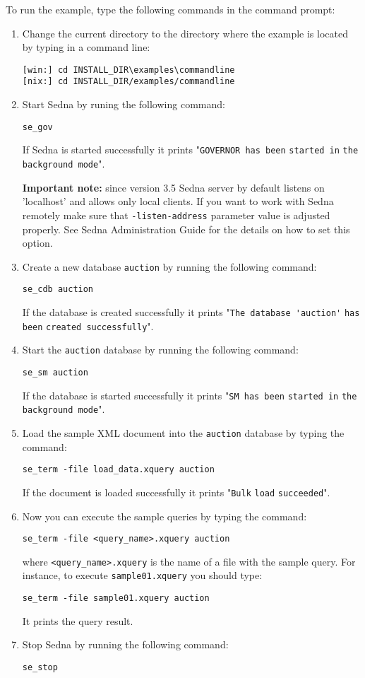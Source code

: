 \documentclass[a4paper,12pt]{article}
\begin{document}
To run the example, type the following commands in the command prompt:
\begin{enumerate}
\item Change the current directory to the directory where the example is located
by typing in a command line:
\begin{verbatim}
[win:] cd INSTALL_DIR\examples\commandline
[nix:] cd INSTALL_DIR/examples/commandline
\end{verbatim}

\item Start Sedna by runing the following command:
\begin{verbatim}
se_gov
\end{verbatim}
If Sedna is started successfully it prints "\verb!GOVERNOR has been!
\verb!started in! \verb!the background mode!".

\textbf{Important note:} since version 3.5 Sedna server by default listens
on 'localhost' and allows only local clients. If you want to work with Sedna
remotely make sure that \verb!-listen-address! parameter value is
adjusted properly. See Sedna Administration Guide for the details on how to set
this option.

\item Create a new database \verb!auction! by running the following command:
\begin{verbatim}
se_cdb auction
\end{verbatim}
If the database is created successfully it prints "\verb!The database 'auction'!
\verb!has been! \verb!created successfully!".

\item Start the \verb!auction! database by running the following command:
\begin{verbatim}
se_sm auction
\end{verbatim}
If the database is started successfully it prints "\verb!SM has been!
\verb!started in! \verb!the background mode!".

\item Load the sample XML document into the \verb!auction! database by typing
the command:
\begin{verbatim}
se_term -file load_data.xquery auction
\end{verbatim}
If the document is loaded successfully it prints "\verb!Bulk! \verb!load!
\verb!succeeded!".

\item Now you can execute the sample queries by typing the command:
\begin{verbatim}
se_term -file <query_name>.xquery auction
\end{verbatim}
where \verb!<query_name>.xquery! is the name of a file with the sample query.
For instance, to execute \verb!sample01.xquery! you should type:
\begin{verbatim}
se_term -file sample01.xquery auction
\end{verbatim}
It prints the query result.

\item Stop Sedna by running the following command:
\begin{verbatim}
se_stop
\end{verbatim}
\end{enumerate}
\end{document}
